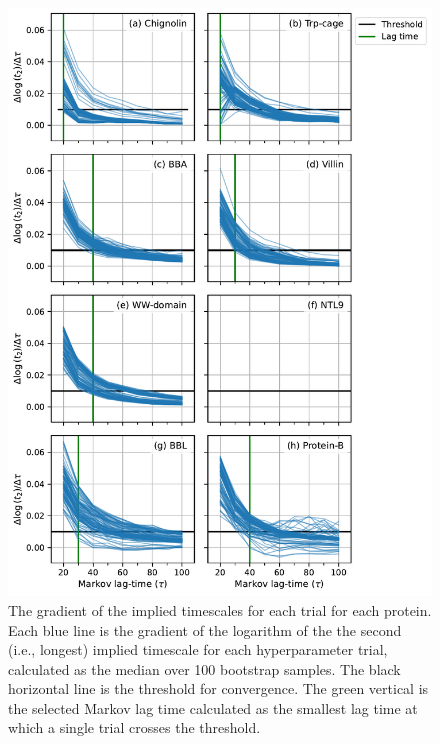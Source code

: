 \documentclass{article}
\begin{document}
\begin{figure}
    \centering
    \includegraphics[height=0.8\textheight]{figures/t_2_gradient_sharey_True_log_True_denom_delta_x.pdf}
    \caption{The gradient of the implied timescales for each trial for each protein.  Each blue line is the gradient of the logarithm of the the second (i.e., longest) implied timescale for each hyperparameter trial, calculated as the median over \num{100} bootstrap samples. The black horizontal line is the threshold for convergence. The green vertical is the selected Markov lag time calculated as the smallest lag time at which a single trial crosses the threshold.}
    \label{fig:its_grad_all}
\end{figure}
\end{document}
